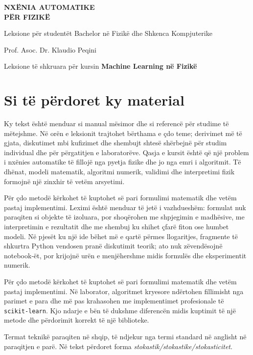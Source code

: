 \documentclass[12pt,a4paper,oneside]{book}
\begin{document}
\frontmatter
\begin{titlepage}
\centering
\vspace*{2cm}
{\Huge\bfseries NXËNIA AUTOMATIKE\\[0.4cm] PËR FIZIKË\par}
\vspace{0.8cm}
{\Large Leksione për studentët Bachelor në Fizikë dhe Shkenca Kompjuterike\par}
\vfill
{\large Prof. Asoc. Dr. Klaudio Peqini\par}
\vspace{0.5cm}
{\large Leksione të shkruara për kursin \textbf{Machine Learning në Fizikë} \par}
\vfill
\end{titlepage}
\chapter*{Si të përdoret ky material}
Ky tekst është menduar si manual mësimor dhe si referencë për studime të mëtejshme. Në orën e leksionit trajtohet bërthama e çdo teme; derivimet më të gjata, diskutimet mbi kufizimet dhe shembujt shtesë shërbejnë për studim individual dhe për përgatitjen e laboratorëve. Qasja e kursit është që një problem i nxënies automatike të fillojë nga pyetja fizike dhe jo nga emri i algoritmit. Të dhënat, modeli matematik, algoritmi numerik, validimi dhe interpretimi fizik formojnë një zinxhir të vetëm arsyetimi.

Për çdo metodë kërkohet të kuptohet së pari formulimi matematik dhe vetëm pastaj implementimi. Leximi është menduar të jetë i vazhdueshëm: formulat nuk paraqiten si objekte të izoluara, por shoqërohen me shpjegimin e madhësive, me interpretimin e rezultatit dhe me shembuj ku shihet çfarë fiton ose humbet modeli. Në pjesët ku një ide bëhet më e qartë përmes llogaritjes, fragmente të shkurtra Python vendosen pranë diskutimit teorik; ato nuk zëvendësojnë notebook-ët, por krijojnë urën e menjëhershme midis formulës dhe eksperimentit numerik.

Për çdo metodë kërkohet të kuptohet së pari formulimi matematik dhe vetëm pastaj implementimi. Në laborator, algoritmet kryesore ndërtohen fillimisht nga parimet e para dhe më pas krahasohen me implementimet profesionale të \texttt{scikit-learn}. Kjo ndarje e bën të dukshme diferencën midis kuptimit të një metode dhe përdorimit korrekt të një biblioteke.

Termat teknikë paraqiten në shqip, të ndjekur nga termi standard në anglisht në paraqitjen e parë. Në tekst përdoret forma \emph{stokastik/stokastike/stokasticitet}.
\tableofcontents
\end{document}
